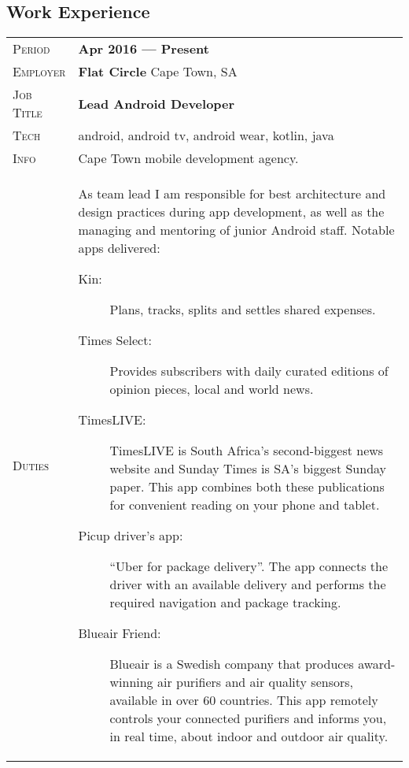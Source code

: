 \documentclass[a4paper, oneside, final]{scrartcl} %
\newcommand{\gray}{\rowcolor[gray]{.90}} %
\newcommand{\subSecHeadWidth}{2.1cm}
\begin{document}
\begin{center}
\section{Work Experience}


\begin{tabularx}{0.97\linewidth}{>{\raggedleft\scshape}p{\subSecHeadWidth}X}
\gray Period & \textbf{Apr 2016 --- Present}\\
\gray Employer & \textbf{Flat Circle} \hfill Cape Town, SA\\
\gray Job Title & \textbf{Lead Android Developer}\\
\gray Tech & android, android tv, android wear, kotlin, java\\
Info & Cape Town mobile development agency. \\
Duties & As team lead I am responsible for best architecture and design practices during app development, as well as the managing and mentoring of junior Android staff. Notable apps delivered: 
\begin{description}
\item[Kin:] Plans, tracks, splits and settles shared expenses.
\item[Times Select:] Provides subscribers with daily curated editions of opinion pieces, local and world news.
\item[TimesLIVE:] TimesLIVE is South Africa's second-biggest news website and Sunday Times is SA's biggest Sunday paper. This app combines both these publications for convenient reading on your phone and tablet.
\item[Picup driver's app:] “Uber for package delivery”. The app connects the driver with an available delivery and performs the required navigation and package tracking.
\item[Blueair Friend:] Blueair is a Swedish company that produces award-winning air purifiers and air quality sensors, available in over 60 countries. This app remotely controls your connected purifiers and informs you, in real time, about indoor and outdoor air quality.

\end{description}
\end{tabularx}

\vspace{12pt}


\end{center}
\end{document}
